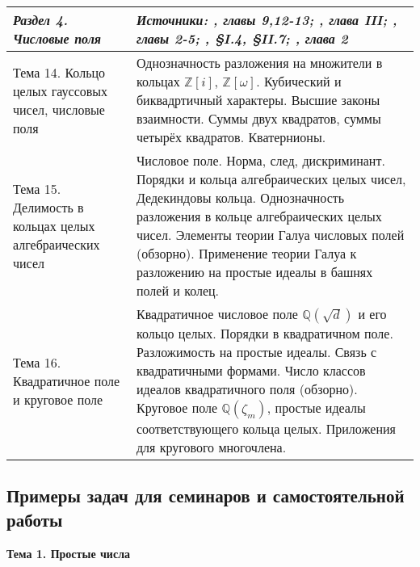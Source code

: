 \documentclass[a4paper, 12pt]{article}
\begin{document}
\begin{longtable}{ | >{\raggedright}p{6cm} | p{9cm} | }
    \textit{Раздел 4. Числовые поля} & \textit{Источники: \cite{IR}, главы 9,12-13; \cite{BSh}, глава III; \cite{Marc}, главы 2-5; \cite{Cox}, \S I.4, \S II.7; \cite{DSV}, глава 2} \\ \hline
    Тема 14. Кольцо целых гауссовых чисел, числовые поля & Однозначность разложения на множители в кольцах $\mathbb{Z}[i]$, $\mathbb{Z}[\omega]$. Кубический и биквадртичный характеры. Высшие законы взаимности. Суммы двух квадратов, суммы четырёх квадратов. Кватернионы. \\ \hline
    Тема 15. Делимость в кольцах целых алгебраических чисел & Числовое поле. Норма, след, дискриминант. Порядки и кольца алгебраических целых чисел, Дедекиндовы кольца. Однозначность разложения в кольце алгебраических целых чисел. Элементы теории Галуа числовых полей (обзорно). Применение теории Галуа к разложению на простые идеалы в башнях полей и колец. \\ \hline
    Тема 16. Квадратичное поле и круговое поле & Квадратичное числовое поле $\mathbb{Q}(\sqrt{d})$ и его кольцо целых. Порядки в квадратичном поле. Разложимость на простые идеалы. Связь с квадратичными формами. Число классов идеалов квадратичного поля (обзорно). Круговое поле $\mathbb{Q}(\zeta_m)$, простые идеалы соответствующего кольца целых. Приложения для кругового многочлена. \\ \hline
    
\end{longtable}

\subsection{Примеры задач для семинаров и самостоятельной работы \label{problems}}

\begin{center} {\bf Тема 1. Простые числа} \end{center}
\end{document}
